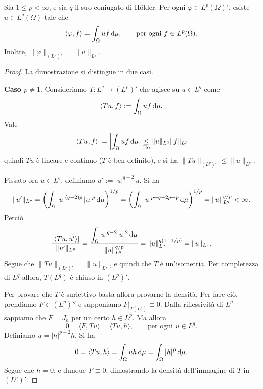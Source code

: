 \begin{theorem}
\label{th:riesz_repr}
	Sia $1 \leq p < \infty$, e sia $q$ il suo coniugato di H\"older.
	Per ogni $\varphi \in L^p(\Omega)'$, esiste $u \in L^q(\Omega)$ tale che
	\begin{equation*}
		\langle \varphi, f \rangle = \int_\Omega uf\,\mathrm{d}\mu, \qquad \text{per ogni $f \in L^p(\Omega)$}.
	\end{equation*}
	Inoltre, $\|\varphi\|_{(L^p)'} = \|u\|_{L^q}$.
\end{theorem}
\begin{proof}
	La dimostrazione si distingue in due casi.

	\textbf{Caso $p \neq 1$}. Consideriamo $T:L^q \to (L^p)'$ che agisce su $u \in L^q$ come
	\begin{equation*}
		\langle Tu, f \rangle := \int_\Omega uf \,\mathrm{d}\mu.
	\end{equation*}
	Vale
	\begin{equation*}
		|\langle Tu, f \rangle| = \left| \int_\Omega uf\,\mathrm{d}\mu \right| \underset{\text{H\"o}}\leq \|u\|_{L^q} \|f\|_{L^p}
	\end{equation*}
	quindi $Tu$ è lineare e continuo ($T$ è ben definito), e si ha $\|Tu\|_{(L^p)'} \leq \|u\|_{L^q}$.

	Fissato ora $u \in L^q$, definiamo $u' := |u|^{q-2} \, u$. Si ha
	\begin{equation*}
		\|u'\|_{L^p}
		= \left( \int_\Omega |u|^{(q-2)p}\,|u|^p\,\mathrm{d}\mu \right)^{1/p}
		= \left( \int_\Omega |u|^{p+q-2p+p}\,\mathrm{d}\mu \right)^{1/p}
		= \|u\|_{L^q}^{q/p} < \infty.
	\end{equation*}
	Perciò
	\begin{equation*}
		\frac{|\langle Tu, u'\rangle|}{\|u'\|_{L^p}} = \frac{{\displaystyle \int_\Omega} |u|^{q-2}|u|^2\,\mathrm{d}\mu}{\|u\|_{L^q}^{q/p}} = \|u\|_{L^q}^{q(1-1/p)} = \|u\|_{L^q}.
	\end{equation*}
	Segue che $\|Tu\|_{(L^p)'} = \|u\|_{L^q}$, e quindi che $T$ è un'isometria.
	Per completezza di $L^q$ allora, $T(L^q)$ è chiuso in $(L^p)'$.

	Per provare che $T$ è suriettivo basta allora provarne la densità. Per fare ciò, prendiamo $F \in (L^p)''$ e supponiamo $F\vert_{T(L^q)} \equiv 0$.
	Dalla riflessività di $L^p$ sappiamo che $F = J_h$ per un certo $h \in L^p$. Ma allora
	\begin{equation*}
		0 = \langle F, Tu \rangle = \langle Tu, h \rangle, \qquad \text{per ogni $u \in L^q$}.
	\end{equation*}
	Definiamo $u = |h|^{p-2} h$. Si ha
	\begin{equation*}
		0 = \langle Tu, h \rangle = \int_\Omega uh\,\mathrm{d}\mu = \int_\Omega |h|^p\,\mathrm{d}\mu.
	\end{equation*}
	Segue che $h=0$, e dunque $F \equiv 0$, dimostrando la densità dell'immagine di $T$ in $(L^p)'$.


\end{proof}
